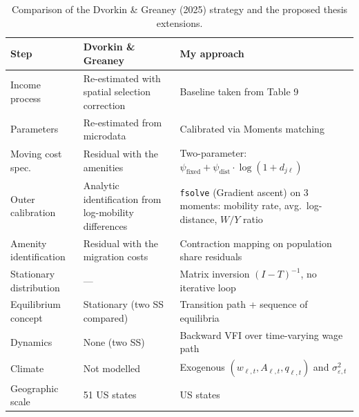 \begin{table}[H]
\centering
\small
\renewcommand{\arraystretch}{1.3}
\begin{tabular}{>{\raggedright}p{3.2cm}
                >{\raggedright}p{5.0cm}
                >{\raggedright\arraybackslash}p{5.4cm}}
\toprule
\textbf{Step} & \textbf{Dvorkin \& Greaney} & \textbf{My approach} \\
\midrule
Income process & Re-estimated with spatial selection correction
               & Baseline taken from Table 9 \\
\addlinespace
Parameters & Re-estimated from microdata
                & Calibrated via Moments matching \\
\addlinespace
Moving cost spec. & Residual with the amenities
                  & Two-parameter: $\psi_{\text{fixed}} + \psi_{\text{dist}} \cdot \log(1 + d_{j\ell})$ \\
\addlinespace
Outer calibration & Analytic identification from log-mobility differences
                  & \texttt{fsolve} (Gradient ascent) on 3 moments: mobility rate, avg.\ log-distance, $W/Y$ ratio \\
\addlinespace
Amenity identification & Residual with the migration costs
                       & Contraction mapping on population share residuals \\
\addlinespace
Stationary distribution & --- & Matrix inversion $(I-T)^{-1}$, no iterative loop \\
\addlinespace
Equilibrium concept & Stationary (two SS compared)
                    & Transition path + sequence of equilibria \\
\addlinespace
Dynamics & None (two SS)
         & Backward VFI over time-varying wage path \\
\addlinespace
Climate & Not modelled
        & Exogenous $(w_{\ell,t}, A_{\ell,t}, q_{\ell,t})$ and $\sigma^2_{\varepsilon,t}$  \\
\addlinespace
Geographic scale & 51 US states
                 & 51 US states\\
\bottomrule
\end{tabular}
\caption{Comparison of the Dvorkin \& Greaney (2025) strategy and the proposed thesis extensions.}
\label{tab:comparison}
\end{table}